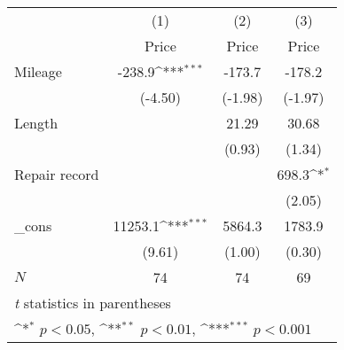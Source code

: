{
\def\sym#1{\ifmmode^{#1}\else\(^{#1}\)\fi}
\begin{tabular}{l*{3}{c}}
\hline\hline
            &\multicolumn{1}{c}{(1)}&\multicolumn{1}{c}{(2)}&\multicolumn{1}{c}{(3)}\\
            &\multicolumn{1}{c}{Price}&\multicolumn{1}{c}{Price}&\multicolumn{1}{c}{Price}\\
\hline
Mileage         &      -238.9\sym{***}&      -173.7         &      -178.2         \\
            &     (-4.50)         &     (-1.98)         &     (-1.97)         \\
[1em]
Length      &                     &       21.29         &       30.68         \\
            &                     &      (0.93)         &      (1.34)         \\
[1em]
Repair record       &                     &                     &       698.3\sym{*}  \\
            &                     &                     &      (2.05)         \\
[1em]
\_cons      &     11253.1\sym{***}&      5864.3         &      1783.9         \\
            &      (9.61)         &      (1.00)         &      (0.30)         \\
\hline
\(N\)       &          74         &          74         &          69         \\
\hline\hline
\multicolumn{4}{l}{\footnotesize \textit{t} statistics in parentheses}\\
\multicolumn{4}{l}{\footnotesize \sym{*} \(p<0.05\), \sym{**} \(p<0.01\), \sym{***} \(p<0.001\)}\\
\end{tabular}
}

